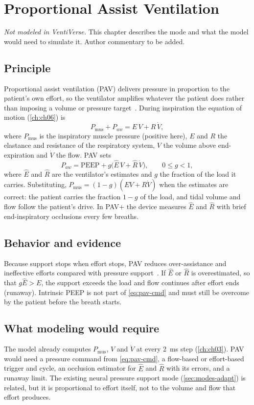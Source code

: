 \chapter{Proportional Assist Ventilation}
\label{ch:pav}

\begin{authornote}
\emph{Not modeled in VentiVerse.} This chapter describes the mode and what the model would need to simulate it. Author commentary to be added.
\end{authornote}

\section{Principle}
Proportional assist ventilation (PAV) delivers pressure in proportion to the patient's own effort, so the ventilator amplifies whatever the patient does rather than imposing a volume or pressure target~\citep{younes1992,younes1992b}. During inspiration the equation of motion (\cref{ch:ch06}) is
\begin{equation}
P_{\mathrm{mus}}+P_{aw}=E\,V+R\,\dot V,
\label{eq:pav-eom}
\end{equation}
where $P_{\mathrm{mus}}$ is the inspiratory muscle pressure (positive here), $E$ and $R$ the elastance and resistance of the respiratory system, $V$ the volume above end-expiration and $\dot V$ the flow. PAV sets
\begin{equation}
P_{aw}=\mathrm{PEEP}+g\bigl(\hat E\,V+\hat R\,\dot V\bigr),\qquad 0\le g<1,
\label{eq:pav-cmd}
\end{equation}
where $\hat E$ and $\hat R$ are the ventilator's estimates and $g$ the fraction of the load it carries. Substituting, $P_{\mathrm{mus}}=(1-g)(EV+R\dot V)$ when the estimates are correct: the patient carries the fraction $1-g$ of the load, and tidal volume and flow follow the patient's drive. In PAV+ the device measures $\hat E$ and $\hat R$ with brief end-inspiratory occlusions every few breaths.

\section{Behavior and evidence}
Because support stops when effort stops, PAV reduces over-assistance and ineffective efforts compared with pressure support~\citep{ranieri1996,xirouchaki2008}. If $\hat E$ or $\hat R$ is overestimated, so that $g\hat E>E$, the support exceeds the load and flow continues after effort ends (runaway). Intrinsic PEEP is not part of \cref{eq:pav-cmd} and must still be overcome by the patient before the breath starts.

\section{What modeling would require}
The model already computes $P_{\mathrm{mus}}$, $V$ and $\dot V$ at every \SI{2}{\milli\second} step (\cref{ch:ch03}). PAV would need a pressure command from \cref{eq:pav-cmd}, a flow-based or effort-based trigger and cycle, an occlusion estimator for $\hat E$ and $\hat R$ with its errors, and a runaway limit. The existing neural pressure support mode (\cref{sec:modes-adapt}) is related, but it is proportional to effort itself, not to the volume and flow that effort produces.
